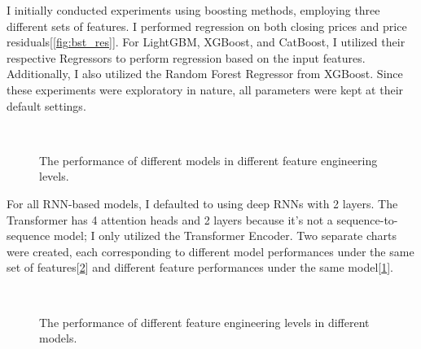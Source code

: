 \documentclass[10pt,twocolumn,letterpaper]{article}
\begin{document}
I initially conducted experiments using boosting methods, employing three different sets of features. I performed regression on both closing prices and price residuals[\ref{fig:bst_res}].
For LightGBM, XGBoost, and CatBoost, I utilized their respective Regressors to perform regression based on the input features.
Additionally, I also utilized the Random Forest Regressor from XGBoost. Since these experiments were exploratory in nature, all parameters were kept at their default settings.
\begin{figure}[h]
	\centering
	 \\
	\caption{The performance of different models in different feature engineering levels.}
	\label{fig:model_res}
\end{figure}

For all RNN-based models, I defaulted to using deep RNNs with 2 layers. The Transformer has 4 attention heads and 2 layers because it's not a sequence-to-sequence model; I only utilized the Transformer Encoder. Two separate charts were created, each corresponding to different model performances under the same set of features[\ref{fig:feats_res}] and different feature performances under the same model[\ref{fig:model_res}].
\begin{figure}[h]
	\centering
	 \\
	\caption{The performance of different feature engineering levels in different models.}
	\label{fig:feats_res}
\end{figure}
\end{document}
